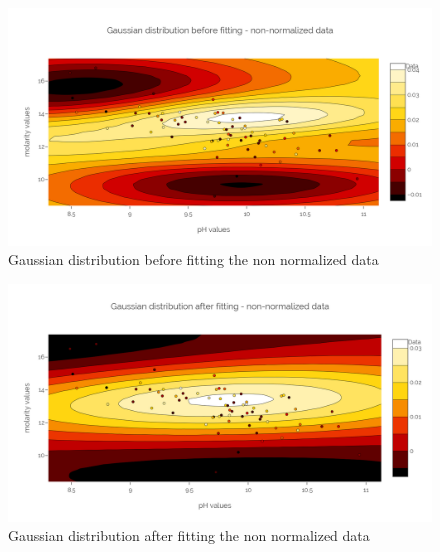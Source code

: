 \documentclass[a4paper]{article}
\begin{document}
\begin{figure}
\centering
\includegraphics[width=1\textwidth]{before_fit_non_norm.png}
\caption{Gaussian distribution before fitting the  non normalized data}
\label{fig:before_fit_non_norm}
\end{figure}

\begin{figure}
	\centering
	\includegraphics[width=1\textwidth]{after_fit_non_norm.png}
	\caption{Gaussian distribution after fitting the  non normalized data}
	\label{fig:after_fit_non_norm}
\end{figure}
\end{document}
